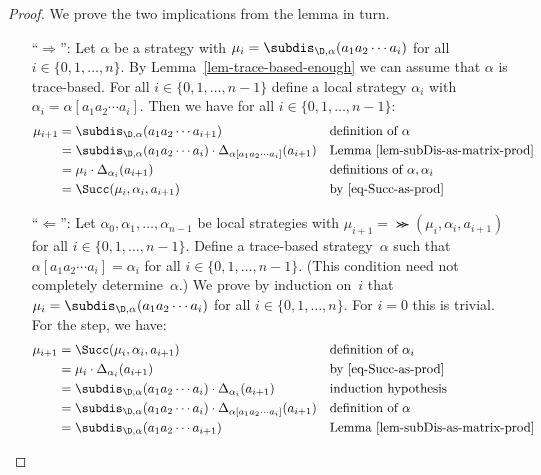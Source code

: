 \begin{proof}
We prove the two implications from the lemma in turn.
\begin{itemize}[align=left]
\item[``$\Longrightarrow$'':]
Let $\alpha$ be a strategy with
$
 \mu_i = \subdis_{\D,\alpha}(a_1 a_2 \cdots a_i)
$
for all $i \in \{0, 1, \ldots, n\}$.
By Lemma~\ref{lem-trace-based-enough} we can assume that $\alpha$ is trace-based.
For all $i \in \{0, 1, \ldots, n-1\}$ define a local strategy $\alpha_i$ with $\alpha_i = \alpha[a_1 a_2 \cdots a_i]$.
Then we have for all $i \in \{0, 1, \ldots, n-1\}$:
\begin{align*}
\mu_{i+1}
& = \subdis_{\D,\alpha}(a_1 a_2 \cdots a_{i+1}) && \text{definition of $\alpha$} \\
& = \subdis_{\D,\alpha}(a_1 a_2 \cdots a_{i}) \cdot \Delta_{\alpha[a_1 a_2 \cdots a_i]}(a_{i+1})
    && \text{Lemma~\ref{lem-subDis-as-matrix-prod}} \\
& = \mu_i \cdot \Delta_{\alpha_i}(a_{i+1})
    && \text{definitions of $\alpha, \alpha_i$} \\
& = \Succ(\mu_i, \alpha_i, a_{i+1})
    && \text{by~\eqref{eq-Succ-as-prod}}
\end{align*}
\item[``$\Longleftarrow$'':]
Let $\alpha_0, \alpha_1, \ldots, \alpha_{n-1}$ be local strategies with
$
 \mu_{i+1} = \Succ(\mu_i, \alpha_i, a_{i+1})
$
for all $i \in \{0, 1, \ldots, n-1\}$.
Define a trace-based strategy~$\alpha$ such that
$\alpha[a_1 a_2 \cdots a_i] = \alpha_i$ for all $i \in \{0, 1, \ldots, n-1\}$.
(This condition need not completely determine~$\alpha$.)
We prove by induction on~$i$ that
$
 \mu_i = \subdis_{\D,\alpha}(a_1 a_2 \cdots a_i)
$
for all $i \in \{0, 1, \ldots, n\}$.
For $i=0$ this is trivial.
For the step, we have:
\begin{align*}
\mu_{i+1}
& = \Succ(\mu_i, \alpha_i, a_{i+1}) && \text{definition of $\alpha_i$} \\
& = \mu_i \cdot \Delta_{\alpha_i}(a_{i+1}) && \text{by~\eqref{eq-Succ-as-prod}} \\
& = \subdis_{\D,\alpha}(a_1 a_2 \cdots a_i) \cdot \Delta_{\alpha_i}(a_{i+1}) && \text{induction hypothesis} \\
& = \subdis_{\D,\alpha}(a_1 a_2 \cdots a_i) \cdot \Delta_{\alpha[a_1 a_2 \cdots a_i]}(a_{i+1}) && \text{definition of $\alpha$} \\
& = \subdis_{\D,\alpha}(a_1 a_2 \cdots a_{i+1}) && \text{Lemma~\ref{lem-subDis-as-matrix-prod}}\qedhere
\end{align*}
\end{itemize}
\end{proof}

